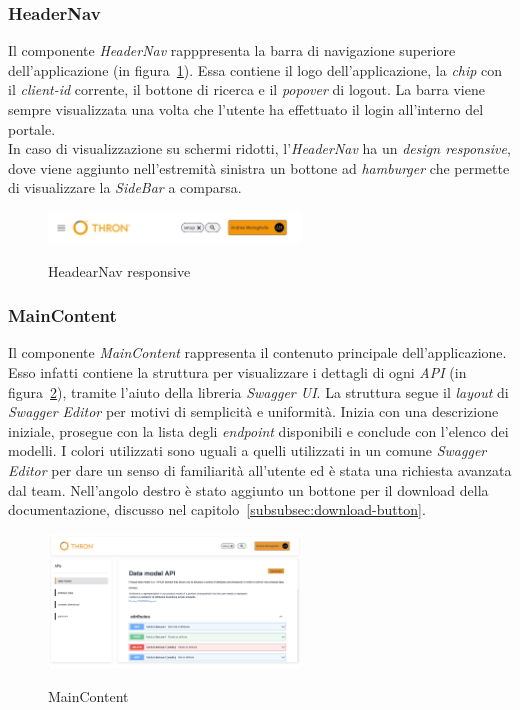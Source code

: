 \subsubsection{HeaderNav}\label{subsubsec:header-nav}
Il componente \textit{HeaderNav} rapppresenta la barra di navigazione superiore dell'applicazione (in figura~\ref{fig:header-nav-responsive}). Essa contiene il logo dell'applicazione, la \textit{chip} con il \textit{client-id}
corrente, il bottone di ricerca e il \textit{popover} di logout. 
La barra viene sempre visualizzata una volta che l'utente ha effettuato il login all'interno del portale.\\
In caso di visualizzazione su schermi ridotti, l'\textit{HeaderNav} ha un \textit{design responsive}, dove viene aggiunto nell'estremità sinistra un bottone ad \textit{hamburger}
che permette di visualizzare la \textit{SideBar} a comparsa.

\begin{figure}[ht]
  \centering
  \includegraphics[width=0.6\textwidth, alt={Barra di navigazione superiore con design responsive}]{images/frontend/HeaderRes.jpg}
  \caption{HeadearNav responsive}\label{fig:header-nav-responsive}
\end{figure}

\subsubsection{MainContent}\label{subsubsec:main-content}
Il componente \textit{MainContent} rappresenta il contenuto principale dell'applicazione. Esso infatti contiene la struttura per visualizzare i dettagli di ogni \textit{API} (in figura~\ref{fig:main-content}), tramite l'aiuto 
della libreria \textit{Swagger UI}.
La struttura segue il \textit{layout} di \textit{Swagger Editor} per motivi di semplicità e uniformità. Inizia con una descrizione iniziale, prosegue con la lista degli \textit{endpoint} disponibili e conclude con l'elenco dei modelli.
I colori utilizzati sono uguali a quelli utilizzati in un comune \textit{Swagger Editor} per dare un senso di familiarità all'utente ed è stata una richiesta avanzata dal team.
Nell'angolo destro è stato aggiunto un bottone per il download della documentazione, discusso nel capitolo~\ref{subsubsec:download-button}.
\begin{figure}[ht]
  \centering
  \includegraphics[width=0.6\textwidth, alt={Sezione per la visualizzazione dei dettagli di un API}]{images/frontend/DataModelView.jpg}
  \caption{MainContent}\label{fig:main-content}
\end{figure}
\pagebreak

